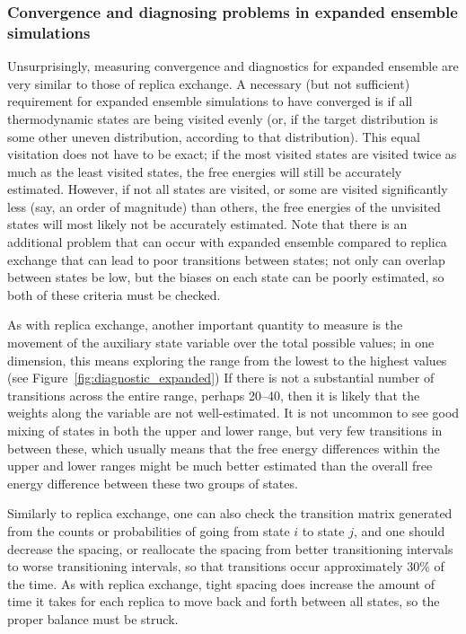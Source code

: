 \documentclass[9pt,review]{livecoms}
\begin{document}
\subsubsection{Convergence and diagnosing problems in expanded ensemble simulations}

Unsurprisingly, measuring convergence and diagnostics for expanded ensemble are very similar to those of replica exchange.  A necessary (but not sufficient) requirement for expanded ensemble simulations to have converged is if all thermodynamic states are being visited evenly (or, if the target distribution is some other uneven distribution, according to that distribution). This equal visitation does not have to be exact; if the most visited states are visited twice as much as the least visited states, the free energies will still be accurately estimated. However, if not all states are visited, or some are visited significantly less (say, an order of magnitude) than others, the free energies of the unvisited states will most likely not be accurately estimated.  Note that there is an additional problem that can occur with expanded ensemble compared to replica exchange that can lead to poor transitions between states; not only can overlap between states be low, but the biases on each state can be poorly estimated, so both of these criteria must be checked.

As with replica exchange, another important quantity to measure is the movement of the auxiliary state variable over the total possible values; in one dimension, this means exploring the range from the lowest to the highest values (see Figure~\ref{fig:diagnostic_expanded}) If there is not a substantial number of transitions across the entire range, perhaps 20--40, then it is likely that the weights along the variable are not well-estimated. It is not uncommon to see good mixing of states in both the upper and lower range, but very few transitions in between these, which usually means that the free energy differences within the upper and lower ranges might be much better estimated than the overall free energy difference between these two groups of states.

Similarly to replica exchange, one can also check the transition matrix generated from the counts or probabilities of going from state $i$ to state $j$, and one should decrease the spacing, or reallocate the spacing from better transitioning intervals to worse transitioning intervals, so that transitions occur approximately 30\% of the time.  As with replica exchange, tight spacing does increase the amount of time it takes for each replica to move back and forth between all states, so the proper balance must be struck.
\end{document}
